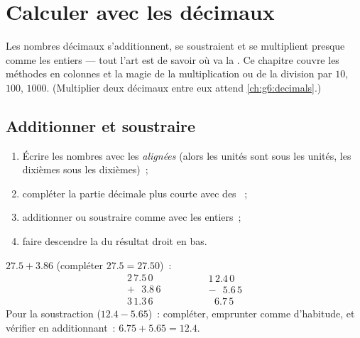 \chapter{Calculer avec les décimaux}\label{ch:g5:decimalops}

Les nombres décimaux s'additionnent, se soustraient et se
multiplient presque comme les entiers --- tout l'art est de savoir
où va la . Ce chapitre couvre les méthodes en colonnes et la
magie de la multiplication ou de la division par $10$, $100$,
$1000$. (Multiplier deux décimaux entre eux attend
\cref{ch:g6:decimals}.)

\section{Additionner et soustraire}

\begin{method}\label{met:g5:decimalops:addsub}
\begin{enumerate}
  \item Écrire les nombres avec les \emph{ alignées}
        (alors les unités sont sous les unités, les dixièmes sous
        les dixièmes)~;
  \item compléter la partie décimale plus courte avec des ~;
  \item additionner ou soustraire comme avec les entiers~;
  \item faire descendre la  du résultat droit en bas.
\end{enumerate}
\end{method}

\begin{example}\label{ex:g5:decimalops:addsub}
$27.5 + 3.86$ (compléter $27.5 = 27.50$)~:
\[
\begin{array}{r}
2\,7.5\,0 \\
+\ \ \ 3.8\,6 \\
\hline
3\,1.3\,6
\end{array}
\qquad\qquad
\begin{array}{r}
1\,2.4\,0 \\
-\ \ \ 5.6\,5 \\
\hline
\ \ \,6.7\,5
\end{array}
\]
Pour la soustraction ($12.4 - 5.65$)~: compléter, emprunter comme
d'habitude, et vérifier en additionnant~: $6.75 + 5.65 = 12.4$.
\end{example}

